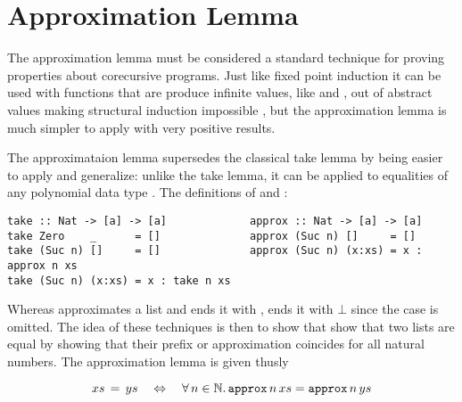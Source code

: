 \section{Approximation Lemma}
\label{sec:approx}

The approximation lemma must be considered a standard technique for
proving properties about corecursive programs. Just like fixed point
induction it can be used with functions that are produce infinite
values, like  and , out of abstract values
making structural induction impossible \cite{corecursive}, but the
approximation lemma is much simpler to apply with very positive
results.

The approximataion lemma supersedes the classical take lemma
\cite{introfp} by being easier to apply and generalize: unlike the
take lemma, it can be applied to equalities of any polynomial
data type \cite{genapprox}. The definitions of  and
: %



\begin{verbatim}
take :: Nat -> [a] -> [a]             approx :: Nat -> [a] -> [a]
take Zero    _      = []              approx (Suc n) []     = []
take (Suc n) []     = []              approx (Suc n) (x:xs) = x : approx n xs
take (Suc n) (x:xs) = x : take n xs
\end{verbatim}

Whereas  approximates a list and ends it with \hs{[]},
 ends it with $\bot$ since the  case is
omitted. The idea of these techniques is then to show that show that
two lists are equal by showing that their prefix or approximation
coincides for all natural numbers. The approximation lemma is given thusly

\begin{equation}
\label{eq:approxeq}
xs \, = \, ys \quad \Leftrightarrow \quad \fa{n \in \mathbb{N}} \hs{approx} \, n \, xs = \hs{approx} \, n \, ys
\end{equation}

